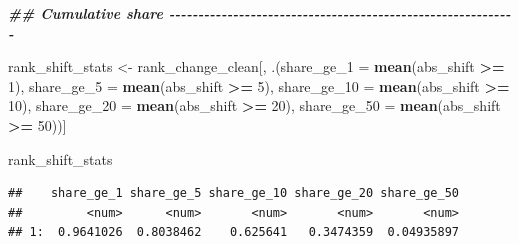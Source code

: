 \documentclass[
  11pt,
]{article}
\newenvironment{Shaded}{\begin{snugshade}}{\end{snugshade}}
\newcommand{\AttributeTok}[1]{\textcolor[rgb]{0.13,0.29,0.53}{#1}}
\newcommand{\DecValTok}[1]{\textcolor[rgb]{0.00,0.00,0.81}{#1}}
\newcommand{\DocumentationTok}[1]{\textcolor[rgb]{0.56,0.35,0.01}{\textbf{\textit{#1}}}}
\newcommand{\FunctionTok}[1]{\textcolor[rgb]{0.13,0.29,0.53}{\textbf{#1}}}
\newcommand{\NormalTok}[1]{#1}
\newcommand{\OtherTok}[1]{\textcolor[rgb]{0.56,0.35,0.01}{#1}}
\newcommand{\SpecialCharTok}[1]{\textcolor[rgb]{0.81,0.36,0.00}{\textbf{#1}}}
\begin{document}
\begin{Shaded}
\begin{Highlighting}[]
\DocumentationTok{\#\# Cumulative share {-}{-}{-}{-}{-}{-}{-}{-}{-}{-}{-}{-}{-}{-}{-}{-}{-}{-}{-}{-}{-}{-}{-}{-}{-}{-}{-}{-}{-}{-}{-}{-}{-}{-}{-}{-}{-}{-}{-}{-}{-}{-}{-}{-}{-}{-}{-}{-}{-}{-}{-}{-}{-}{-}{-}{-}{-}{-}{-}{-}}

\NormalTok{rank\_shift\_stats }\OtherTok{\textless{}{-}}\NormalTok{ rank\_change\_clean[, .(}\AttributeTok{share\_ge\_1  =} \FunctionTok{mean}\NormalTok{(abs\_shift }\SpecialCharTok{\textgreater{}=} \DecValTok{1}\NormalTok{),}
                                          \AttributeTok{share\_ge\_5  =} \FunctionTok{mean}\NormalTok{(abs\_shift }\SpecialCharTok{\textgreater{}=} \DecValTok{5}\NormalTok{),}
                                          \AttributeTok{share\_ge\_10 =} \FunctionTok{mean}\NormalTok{(abs\_shift }\SpecialCharTok{\textgreater{}=} \DecValTok{10}\NormalTok{), }
                                          \AttributeTok{share\_ge\_20 =} \FunctionTok{mean}\NormalTok{(abs\_shift }\SpecialCharTok{\textgreater{}=} \DecValTok{20}\NormalTok{), }
                                          \AttributeTok{share\_ge\_50 =} \FunctionTok{mean}\NormalTok{(abs\_shift }\SpecialCharTok{\textgreater{}=} \DecValTok{50}\NormalTok{))]}

\NormalTok{rank\_shift\_stats}
\end{Highlighting}
\end{Shaded}

\begin{verbatim}
##    share_ge_1 share_ge_5 share_ge_10 share_ge_20 share_ge_50
##         <num>      <num>       <num>       <num>       <num>
## 1:  0.9641026  0.8038462    0.625641   0.3474359  0.04935897
\end{verbatim}
\end{document}
